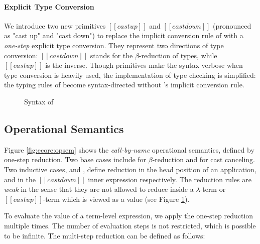\paragraph{Explicit Type Conversion}

We introduce two new primitives $[[castup]]$ and $[[castdown]]$
(pronounced as "cast up" and "cast down") to replace the implicit
conversion rule of \cc with a \emph{one-step} explicit type
conversion. They represent two directions of type conversion:
$[[castdown]]$ stands for the $\beta$-reduction of types, while
$[[castup]]$ is the inverse. %
Though \cast primitives make the syntax verbose when type conversion
is heavily used, the implementation of type checking is simplified:
the typing rules of \ecore become syntax-directed without \cc's
implicit conversion rule. 

\begin{figure}
    \gram{\ottec\ottinterrule
        \ottG\ottinterrule
        \ottv}
    \caption{Syntax of \ecore}
    \label{fig:ecore:syntax}
\end{figure}

\subsection{Operational Semantics}\label{sec:ecore:opsem}

Figure \ref{fig:ecore:opsem} shows the \emph{call-by-name} operational
semantics, defined by one-step reduction. Two base cases include
 for $\beta$-reduction and 
for cast canceling. Two inductive cases,  and
, define reduction in the head position of an
application, and in the $[[castdown]]$ inner expression
respectively. The reduction rules are \emph{weak} in the sense that they
are not allowed to reduce inside a $\lambda$-term or $[[castup]]$-term
which is viewed as a value (see Figure \ref{fig:ecore:syntax}).

To evaluate the value of a term-level expression, we apply the
one-step reduction multiple times. The number of evaluation steps is
not restricted, which is possible to be infinite. The multi-step
reduction can be defined as follows:

